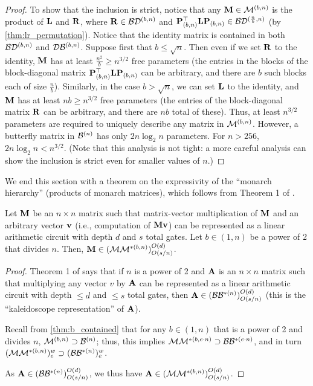 \begin{proof}
To show that the inclusion is strict, notice that any $\mathbf{M} \in \mathcal{M}^{(b,n)}$ is the product of $\mathbf{L}$ and $\mathbf{R}$, where $\mathbf{R} \in \mathcal{B}\mathcal{D}^{(b, n)}$ and $\mathbf{P}_{(b,n)}^\top \mathbf{L} \mathbf{P}_{(b,n)} \in \mathcal{B}\mathcal{D}^{(\frac{n}{b}, n)}$ (by \cref{thm:lr_permutation}). Notice that the identity matrix is contained in both $\mathcal{B}\mathcal{D}^{(b,n)}$ and $\mathcal{D}\mathcal{B}^{(b,n)}$. Suppose first that $b \le \sqrt{n}$. Then even if we set $\mathbf{R}$ to the identity, $\mathbf{M}$ has at least $\frac{n^2}{b} \ge n^{3/2}$ free parameters (the entries in the blocks of the block-diagonal matrix $\mathbf{P}_{(b,n)}^\top \mathbf{L} \mathbf{P}_{(b,n)}$ can be arbitrary, and there are $b$ such blocks each of size $\frac{n}{b}$). Similarly, in the case $b > \sqrt{n}$, we can set $\mathbf{L}$ to the identity, and $\mathbf{M}$ has at least $nb \ge n^{3/2}$ free parameters (the entries of the block-diagonal matrix $\mathbf{R}$ can be arbitrary, and there are $nb$ total of these). Thus, at least $n^{3/2}$ parameters are required to uniquely describe any matrix in $\mathcal{M}^{(b,n)}$. However, a butterfly matrix in $\mathcal{B}^{(n)}$ has only $2n \log_2 n$ parameters. For $n > 256$, $2n \log_2 n < n^{3/2}$. (Note that this analysis is not tight: a more careful analysis can show the inclusion is strict even for smaller values of $n$.)

\end{proof}

We end this section with a theorem on the expressivity of the ``monarch hierarchy'' (products of monarch matrices), which follows from Theorem 1 of \cite{dao2020kaleidoscope}.
\begin{theorem}
\label{thm:monarch_hierarchy}
Let $\mathbf{M}$ be an $n \times n$ matrix such that matrix-vector multiplication of $\mathbf{M}$ and an arbitrary vector $\mathbf{v}$ (i.e., computation of $\mathbf{M} \mathbf{v}$) can
be represented as a linear arithmetic circuit with depth $d$ and $s$ total gates. Let $b \in (1, n)$ be a power of 2 that divides $n$.
Then, $\mathbf{M} \in (\mathcal{M}\mathcal{M}^{*(b, n)})^{O(d)}_{O(s/n)}$.
\end{theorem}
\begin{proof}
Theorem 1 of \citet{dao2020kaleidoscope} says that if $n$ is a power of 2 and $\mathbf{A}$ is an $n \times n$ matrix such that multiplying any vector $v$ by $\mathbf{A}$ can be represented as a linear arithmetic circuit with depth $\le d$ and $\le s$ total gates, then $\mathbf{A} \in (\mathcal{B}\mathcal{B}^{*(n)})^{O(d)}_{O(s/n)}$ (this is the ``kaleidoscope representation'' of $\mathbf{A}$).

Recall from \cref{thm:b_contained} that for any $b \in (1, n)$ that is a power of 2 and divides $n$, $\mathcal{M}^{(b, n)} \supset \mathcal{B}^{(n)}$; thus, this implies $\mathcal{M}\mathcal{M}^{*(b,e\cdot n)} \supset \mathcal{B}\mathcal{B}^{*(e\cdot n)}$, and in turn $(\mathcal{M}\mathcal{M}^{*(b,n)})^w_e \supset (\mathcal{B}\mathcal{B}^{*(n)})^w_e$.

As $\mathbf{A} \in  (\mathcal{B}\mathcal{B}^{*(n)})^{O(d)}_{O(s/n)}$, we thus have $\mathbf{A} \in  (\mathcal{M}\mathcal{M}^{*(b,n)})^{O(d)}_{O(s/n)}$.
\end{proof}

